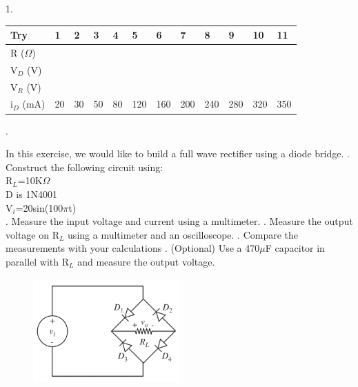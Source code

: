{	\begin{solution}
		1.
		\begin{table}[h]
			\begin{tabular}{| l | l | l | l | l | l | l | l | l | l | l | l |}
				\hline
				Try          & 1 & 2 & 3 & 4 & 5 & 6 & 7 & 8 & 9 & 10 & 11 \\ \hline
				R (\(\Omega\))   &   &   &   &   &   &   &   &   &   &    &    \\ \hline
				V$_{D}$ (V)  &   &   &   &   &   &   &   &   &   &    &    \\ \hline
				V$_{R}$ (V)  &   &   &   &   &   &   &   &   &   &    &    \\ \hline
				i$_{D}$ (mA) & 20 & 30 & 50 & 80 & 120 & 160 & 200 & 240 & 280 & 320 & 350 \\ \hline
			\end{tabular}
		\end{table}
		.
	\end{solution}
	\clearpage
	\begin{problem}
		In this exercise, we would like to build a full wave rectifier using a diode bridge.
		. Construct the following circuit using:\\
		R\(_{L}\)=10K\(\Omega\)\\
		D is 1N4001\\
		V\(_{i}\)=20sin(100\(\pi\)t)\\
		. Measure the input voltage and current using a multimeter.
		. Measure the output voltage on R\(_{L}\) using a multimeter and an oscilloscope.
		. Compare the measurements with your calculations
		. (Optional) Use a 470\(\mu\)F capacitor in parallel with R\(_{L}\) and measure the output voltage.
		\begin{figure}[h!]
			\centering
			\includegraphics[width=0.5\textwidth]{images/circuit2.png}
		\end{figure}
	\end{problem}
	
}
